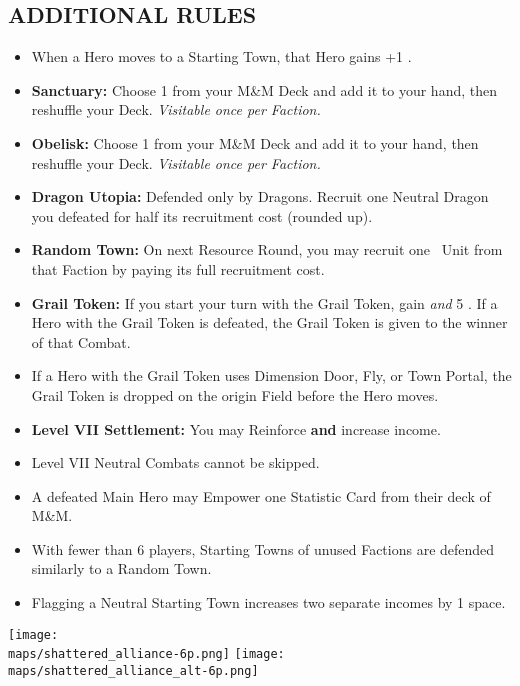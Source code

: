 \begin{multicols*}{2}
\subsection*{\MakeUppercase{Additional Rules}}

\begin{itemize}
  \item When a Hero moves to a Starting Town, that Hero gains +1 .
  \item \textbf{Sanctuary:} Choose 1  from your M\&M Deck and add it to your hand, then reshuffle your Deck. \textit{Visitable once per Faction.}
  \item \textbf{Obelisk:} Choose 1  from your M\&M Deck and add it to your hand, then reshuffle your Deck. \textit{Visitable once per Faction.}
  \item \textbf{Dragon Utopia:} Defended only by Dragons. Recruit one Neutral Dragon you defeated for half its recruitment cost (rounded up).
  \item \textbf{Random Town:} On next Resource Round, you may recruit one \silver\ Unit from that Faction by paying its full recruitment cost.
  \item \textbf{Grail Token:} If you start your turn with the Grail Token, gain  \textit{and} 5 . If a Hero with the Grail Token is defeated, the Grail Token is given to the winner of that Combat.
  \item If a Hero with the Grail Token uses Dimension Door, Fly, or Town Portal, the Grail Token is dropped on the origin Field before the Hero moves.
  \item \textbf{Level VII Settlement:} You may Reinforce \textbf{and} increase income.
  \item Level VII Neutral Combats cannot be skipped.
  \item A defeated Main Hero may Empower one Statistic Card from their deck of M\&M.
  \item With fewer than 6 players, Starting Towns of unused Factions are defended similarly to a Random Town.
  \item Flagging a Neutral Starting Town increases two separate incomes by 1 space.
\end{itemize}

\begin{center}
  \vspace*{\fill}
  \texttt{[image: \\maps/shattered\_alliance-6p.png]}
  \vspace*{\fill}
  \texttt{[image: \\maps/shattered\_alliance\_alt-6p.png]}
  \vspace*{\fill}
\end{center}

\end{multicols*}
